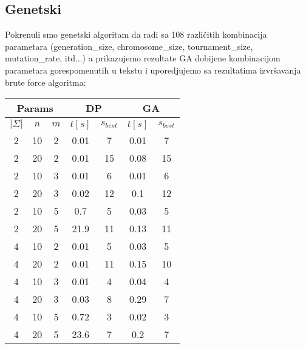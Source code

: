 \documentclass{article}
\begin{document}
    \subsection{Genetski}
    Pokrenuli smo genetski algoritam da radi sa 108 različitih kombinacija parametara (generation\_size, chromosome\_size, tournament\_size, mutation\_rate, itd...) a prikazujemo rezultate GA dobijene kombinacijom parametara gorespomenutih u tekstu i uporedjujemo sa rezultatima izvršavanja brute force algoritma:

    \begin{center}
        \begin{tabular}{| c c c | c c | c c |}
            \hline
            \multicolumn{3}{|c}{Params} & \multicolumn{2}{|c}{DP} & \multicolumn{2}{|c|}{GA} \\
            \hline
            $|\Sigma|$ & $n$ & $m$ & $t[s]$ & $s_{best}$ & $t[s]$ & $s_{best}$ \\
            \hline
            2          & 10  & 2   & 0.01   & 7          & 0.01   & 7          \\
            \hline
            2          & 20  & 2   & 0.01   & 15         & 0.08   & 15         \\
            \hline
            2          & 10  & 3   & 0.01   & 6          & 0.01   & 6          \\
            \hline
            2          & 20  & 3   & 0.02   & 12         & 0.1    & 12         \\
            \hline
            2          & 10  & 5   & 0.7    & 5          & 0.03   & 5          \\
            \hline
            2          & 20  & 5   & 21.9   & 11         & 0.13   & 11         \\
            \hline
            4          & 10  & 2   & 0.01   & 5          & 0.03   & 5          \\
            \hline
            4          & 20  & 2   & 0.01   & 11         & 0.15   & 10         \\
            \hline
            4          & 10  & 3   & 0.01   & 4          & 0.04   & 4          \\
            \hline
            4          & 20  & 3   & 0.03   & 8          & 0.29   & 7          \\
            \hline
            4          & 10  & 5   & 0.72   & 3          & 0.02   & 3          \\
            \hline
            4          & 20  & 5   & 23.6   & 7          & 0.2    & 7          \\

\end{tabular}
\end{center}
\end{document}
